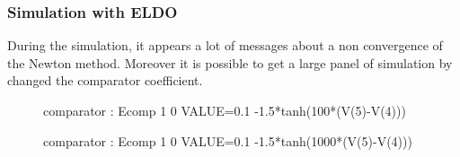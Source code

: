 

\subsubsection{Simulation with ELDO}
During the simulation, it appears a lot of messages about a non convergence of the Newton method.
Moreover it is possible to get a large panel of simulation by changed the comparator coefficient.\\

\begin{figure}[!h]
comparator : Ecomp 1 0 VALUE={0.1 -1.5*tanh(100*(V(5)-V(4)))}
\begin{center}
\end{center}

\end{figure}
\begin{figure}[!h]
comparator : Ecomp 1 0 VALUE={0.1 -1.5*tanh(1000*(V(5)-V(4)))}
\begin{center}
\end{center}
\end{figure}
